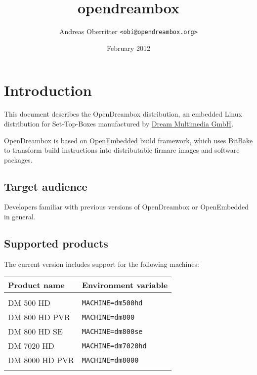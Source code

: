 \documentclass[a4paper]{article}
\newcommand{\shell}[1]{\texttt{\small #1}}
\begin{document}
\title{opendreambox}
\author{Andreas Oberritter \shell{<obi@opendreambox.org>}}
\date{February 2012}
\maketitle
\tableofcontents
\pagebreak

\section{Introduction}
  \begin{flushleft}
    This document describes the OpenDreambox distribution, an embedded Linux
    distribution for Set-Top-Boxes manufactured by \href{http://www.dream-multimedia-tv.de/}{Dream Multimedia GmbH}.

    OpenDreambox is based on \href{http://www.openembedded.org/}{OpenEmbedded} build framework, which
    uses \href{http://bitbake.berlios.de/}{BitBake} to transform build instructions into
    distributable firmare images and software packages.
  \end{flushleft}

  \subsection{Target audience}
    \begin{flushleft}
      Developers familiar with previous versions of OpenDreambox or OpenEmbedded
      in general.
    \end{flushleft}

  \subsection{Supported products}
    \label{products}
    \begin{flushleft}
      The current version includes support for the following machines:

        \begin{tabular}{ | l | l | }
          \hline
          \textbf{Product name} & \textbf{Environment variable} \\ \hline
          & \\
          DM 500 HD & \shell{MACHINE=dm500hd} \\
          DM 800 HD PVR & \shell{MACHINE=dm800} \\
          DM 800 HD SE & \shell{MACHINE=dm800se} \\
          DM 7020 HD & \shell{MACHINE=dm7020hd} \\
          DM 8000 HD PVR & \shell{MACHINE=dm8000} \\
          & \\
          \hline
        \end{tabular}
    \end{flushleft}
\end{document}
